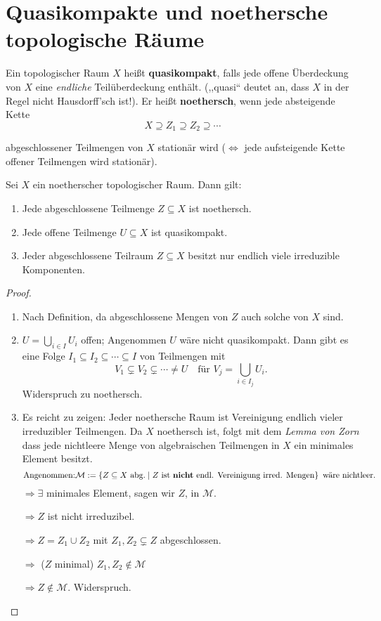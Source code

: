 
\section{Quasikompakte und noethersche topologische Räume}
\label{sec:quasikompakt-noethersch}
\begin{defn}
  \label{def:quasikompakt/noethersch}
  Ein topologischer Raum $X$ heißt \textbf{quasikompakt},
  falls jede offene Überdeckung von $X$ eine \emph{endliche} Teilüberdeckung
  enthält. (,,quasi`` deutet an, dass $X$ in der Regel nicht Hausdorff'sch
  ist!). Er heißt \textbf{noethersch}, wenn jede
  absteigende Kette
  \[
    X\supseteq Z_{1}\supseteq Z_{2}\supseteq\cdots
  \]

  abgeschlossener Teilmengen von $X$ stationär wird ($\Leftrightarrow$
  jede aufsteigende Kette offener Teilmengen wird stationär).
\end{defn}
\begin{lem}
  \label{lem:eigenschaften-noethersch}
  Sei $X$ ein noetherscher topologischer Raum. Dann gilt:
  \begin{enumerate}
  \item Jede abgeschlossene Teilmenge $Z \subseteq X$ ist noethersch.
  \item Jede offene Teilmenge $U \subseteq X$ ist quasikompakt.
  \item Jeder abgeschlossene Teilraum $Z \subseteq X$ besitzt nur endlich viele
    irreduzible Komponenten.
  \end{enumerate}
\end{lem}
\begin{proof}
  \mbox{}
  \begin{enumerate}
  \item Nach Definition, da abgeschlossene Mengen von $Z$ auch solche von
    $X$ sind.
  \item $U=\bigcup_{i\in I}U_{i}$ offen; Angenommen $U$ wäre nicht quasikompakt.
    Dann gibt es eine Folge $I_{1}\subseteq I_{2}\subseteq\cdots\subseteq I$ von Teilmengen
    mit
    \[
      V_{1}\subsetneq V_{2}\subsetneq\cdots\neq U\quad\text{für }V_{j}=\bigcup_{i\in I_{j}}U_{i}.
    \]
    Widerspruch zu noethersch.
  \item Es reicht zu zeigen: Jeder noethersche Raum ist Vereinigung endlich
    vieler irreduzibler Teilmengen. Da $X$ noethersch ist, folgt mit
    dem \emph{Lemma von Zorn} dass jede nichtleere Menge von algebraischen
    Teilmengen in $X$ ein minimales Element besitzt. 
    \[
      \text{Angenommen:} \mathcal{M}:=\left\{ Z\subseteq X\text{ abg.}\mid Z\text{ ist \textbf{nicht} endl. Vereinigung irred. Mengen}\right\} \text{ wäre nichtleer.}
    \]
    $\Rightarrow\exists$ minimales Element, sagen wir $Z$, in $\mathcal{M}$.

    $\Rightarrow Z$ ist nicht irreduzibel.

    $\Rightarrow Z=Z_{1}\cup Z_{2}$ mit $Z_{1},Z_{2}\subsetneq Z$ abgeschlossen.

    $\Rightarrow$ ($Z$ minimal) $Z_{1},Z_{2}\notin\mathcal{M}$

    $\Rightarrow Z\notin\mathcal{M}$. Widerspruch.

  \end{enumerate}
\end{proof}
